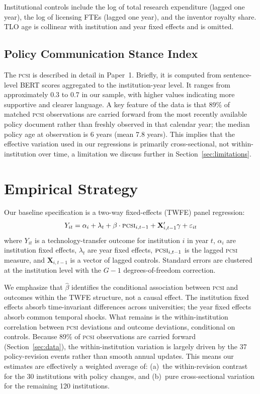 \documentclass[12pt]{article}
\newcommand{\PCSI}{\textsc{pcsi}}
\begin{document}
Institutional controls include the log of total research expenditure (lagged one year),
the log of licensing FTEs (lagged one year), and the inventor royalty share. TLO age
is collinear with institution and year fixed effects and is omitted.

\subsection{Policy Communication Stance Index}

The \PCSI{} is described in detail in Paper~1. Briefly, it is computed from
sentence-level BERT scores aggregated to the institution-year level. It ranges from
approximately 0.3 to 0.7 in our sample, with higher values indicating more supportive
and clearer language. A key feature of the data is that 89\% of matched \PCSI{}
observations are carried forward from the most recently available policy document
rather than freshly observed in that calendar year; the median policy age at
observation is 6 years (mean 7.8 years). This implies that the effective variation
used in our regressions is primarily cross-sectional, not within-institution
over time, a limitation we discuss further in Section~\ref{sec:limitations}.

\section{Empirical Strategy}
\label{sec:strategy}

Our baseline specification is a two-way fixed-effects (TWFE) panel regression:
\begin{equation}
  Y_{it} = \alpha_i + \lambda_t + \beta \cdot \PCSI{}_{i,t-1} + \mathbf{X}_{i,t-1}'\gamma + \varepsilon_{it}
  \label{eq:baseline}
\end{equation}
where $Y_{it}$ is a technology-transfer outcome for institution $i$ in year $t$,
$\alpha_i$ are institution fixed effects, $\lambda_t$ are year fixed effects,
$\PCSI{}_{i,t-1}$ is the lagged \PCSI{} measure, and $\mathbf{X}_{i,t-1}$ is a
vector of lagged controls. Standard errors are clustered at the institution level
with the \citet{cameron2015} $G-1$ degrees-of-freedom correction.

We emphasize that $\hat\beta$ identifies the conditional association between
\PCSI{} and outcomes within the TWFE structure, not a causal effect. The institution
fixed effects absorb time-invariant differences across universities; the year fixed
effects absorb common temporal shocks. What remains is the within-institution
correlation between \PCSI{} deviations and outcome deviations, conditional on controls.
Because 89\% of \PCSI{} observations are carried forward (Section~\ref{sec:data}),
the within-institution variation is largely driven by the 37 policy-revision events
rather than smooth annual updates. This means our estimates are effectively a
weighted average of: (a)~the within-revision contrast for the 30 institutions with
policy changes, and (b)~pure cross-sectional variation for the remaining 120 institutions.
\end{document}
